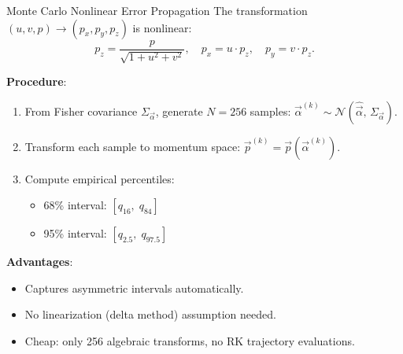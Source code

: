 \documentclass[aspectratio=169]{beamer}
\begin{document}
\begin{frame}{Monte Carlo Nonlinear Error Propagation}
\small
The transformation $(u, v, p) \to (p_x, p_y, p_z)$ is nonlinear:
\[
p_z = \frac{p}{\sqrt{1 + u^2 + v^2}}, \quad p_x = u \cdot p_z, \quad p_y = v \cdot p_z.
\]

\textbf{Procedure}:
\begin{enumerate}
\item From Fisher covariance $\Sigma_{\vec{\alpha}}$, generate $N = 256$ samples: $\vec{\alpha}^{(k)} \sim \mathcal{N}(\hat{\vec{\alpha}},\, \Sigma_{\vec{\alpha}})$.
\item Transform each sample to momentum space: $\vec{p}^{(k)} = \vec{p}(\vec{\alpha}^{(k)})$.
\item Compute empirical percentiles:
\begin{itemize}
\item 68\% interval: $[q_{16},\; q_{84}]$
\item 95\% interval: $[q_{2.5},\; q_{97.5}]$
\end{itemize}
\end{enumerate}

\textbf{Advantages}:
\begin{itemize}
\item Captures asymmetric intervals automatically.
\item No linearization (delta method) assumption needed.
\item Cheap: only 256 algebraic transforms, no RK trajectory evaluations.
\end{itemize}
\end{frame}
\end{document}
